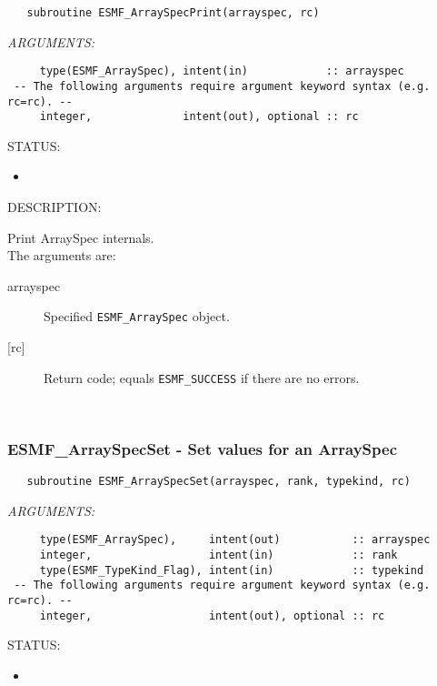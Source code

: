  
\begin{verbatim}   subroutine ESMF_ArraySpecPrint(arrayspec, rc)\end{verbatim}{\em ARGUMENTS:}
\begin{verbatim}     type(ESMF_ArraySpec), intent(in)            :: arrayspec
 -- The following arguments require argument keyword syntax (e.g. rc=rc). --
     integer,              intent(out), optional :: rc\end{verbatim}
{\sf STATUS:}
   \begin{itemize}
   \item{}
   \end{itemize}
  
{\sf DESCRIPTION:\\ }


       Print ArraySpec internals. \\
  
       The arguments are:
       \begin{description}
       \item[arrayspec] 
           Specified {\tt ESMF\_ArraySpec} object.
       \item[{[rc]}]
           Return code; equals {\tt ESMF\_SUCCESS} if there are no errors.
       \end{description}
   
 
\mbox{}\hrulefill\ 
 
\subsubsection [ESMF\_ArraySpecSet] {ESMF\_ArraySpecSet - Set values for an ArraySpec}


  
\begin{verbatim}   subroutine ESMF_ArraySpecSet(arrayspec, rank, typekind, rc)\end{verbatim}{\em ARGUMENTS:}
\begin{verbatim}     type(ESMF_ArraySpec),     intent(out)           :: arrayspec
     integer,                  intent(in)            :: rank
     type(ESMF_TypeKind_Flag), intent(in)            :: typekind
 -- The following arguments require argument keyword syntax (e.g. rc=rc). --
     integer,                  intent(out), optional :: rc\end{verbatim}
{\sf STATUS:}
   \begin{itemize}
   \item{}
   \end{itemize}
  
